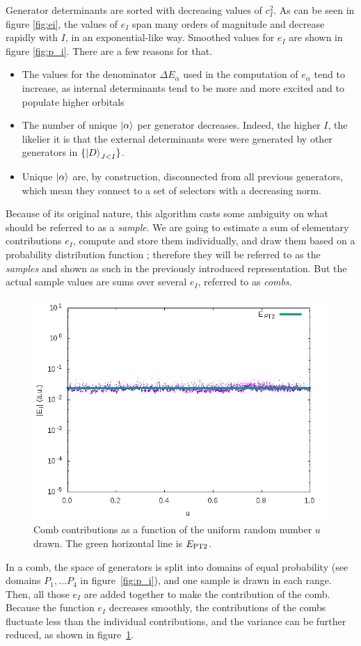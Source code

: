 \documentclass[./thesis.tex]{subfiles}
\begin{document}
Generator determinants are sorted with decreasing values of $c_I^2$.
As can be seen in figure \ref{fig:ei}, the values of $e_I$ span many orders of magnitude and decrease rapidly with $I$, in an exponential-like way. Smoothed values for $e_I$ are shown in figure \ref{fig:p_i}. There are a few reasons for that.
\begin{itemize}
	\item
	The values for the denominator $\Delta E_\alpha$ used in the computation of $e_\alpha$ tend to increase, as internal determinants tend to be more and more excited and to populate higher orbitals 
	\item
	The number of unique $\ket \alpha$ per generator decreases. Indeed, the higher $I$, the likelier it is that the external determinants were were generated by other generators in $\{\ket{D}_{J<I}\}$.
	\item
	Unique $\ket \alpha$ are, by construction, disconnected from all previous generators, which mean they connect to a set of selectors with a decreasing norm.
\end{itemize}


Because of its original nature, this algorithm casts some ambiguity on what should be referred to as a \emph{sample}. We are going to estimate a sum of elementary contributions $e_I$, compute and store them individually, and draw them based on a probability distribution function ; therefore they will be referred to as the \emph{samples} and shown as such in the previously introduced representation. But the actual sample values are sums over several $e_I$, referred to as \emph{combs}.

\begin{figure}[h!]
	\begin{center}
		\includegraphics[width=0.7\columnwidth]{figures/pt2/comb_variance}
	\end{center}
		\caption{Comb contributions as a function of the uniform random number $u$ drawn. The green horizontal line is $E_\text{PT2}$.}
		\label{fig:ei_comb}
\end{figure}
In a comb, the space of generators is split into domains of equal probability (see
domains $P_1, \dots P_4$ in figure~\ref{fig:p_i}), and
one sample is drawn in each range. Then, all those $e_I$ are added together to make the contribution of the comb. Because the function $e_I$ decreases smoothly, the contributions of the combs fluctuate less than the individual contributions, and the variance can be further reduced, as shown in figure~\ref{fig:ei_comb}.
\end{document}
